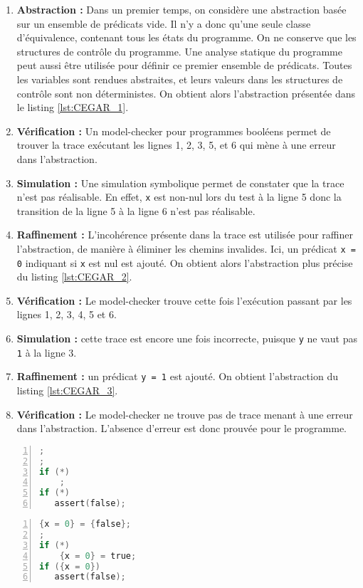 \begin{enumerate}
\def\labelenumi{\arabic{enumi})}
\item
  \textbf{Abstraction :} Dans un premier temps, on considère une abstraction
  basée sur un ensemble de prédicats vide. Il n'y a donc qu'une seule classe
  d'équivalence, contenant tous les états du programme. On ne conserve que les
  structures de contrôle du programme. Une analyse statique du programme peut
  aussi être utilisée pour définir ce premier ensemble de prédicats.
  Toutes les variables sont rendues abstraites, et leurs valeurs dans
  les structures de contrôle sont non déterministes. On obtient alors
  l'abstraction présentée dans le listing \ref{lst:CEGAR_1}.
\item
  \textbf{Vérification :} Un model-checker pour programmes booléens permet de
  trouver la trace exécutant les lignes 1, 2, 3, 5, et 6 qui mène à une erreur
  dans l'abstraction.
\item
  \textbf{Simulation :} Une simulation symbolique permet de constater que la
  trace n'est pas réalisable. En effet, \texttt{x} est non-nul lors
  du test à la ligne 5 donc la transition de la ligne 5 à la ligne 6 n'est pas
  réalisable.
\item
  \textbf{Raffinement :} L'incohérence présente dans la trace est utilisée pour
  raffiner l'abstraction, de manière à éliminer les chemins invalides. Ici, un
  prédicat \texttt{{x = 0}} indiquant si \texttt{x} est nul est ajouté. On
  obtient alors l'abstraction plus précise du listing \ref{lst:CEGAR_2}.
\item
  \textbf{Vérification :} Le model-checker trouve cette fois l'exécution
  passant par les lignes 1, 2, 3, 4, 5 et 6.
\item
  \textbf{Simulation :} cette trace est encore une fois incorrecte, puisque
  \texttt{y} ne vaut pas \texttt{1} à la ligne 3.
\item
  \textbf{Raffinement :} un prédicat \texttt{{y = 1}} est ajouté. On obtient
  l'abstraction du listing \ref{lst:CEGAR_3}.
\item
  \textbf{Vérification :} Le model-checker ne trouve pas de trace menant à une
  erreur dans l'abstraction. L'absence d'erreur est donc prouvée pour le
  programme.
\end{enumerate}

\noindent\begin{minipage}{.45\textwidth}
  \begin{lstlisting}[language=C, label=lst:CEGAR_1, numbers=left, frame=single,
    caption=Abstraction initiale]
;
;
if (*)
    ;
if (*)
   assert(false);
\end{lstlisting}
\end{minipage}\hfill
\begin{minipage}{.45\textwidth}
  \begin{lstlisting}[language=C, label=lst:CEGAR_2, numbers=left, frame=single,
    caption=Premier raffinement]
{x = 0} = {false};
;
if (*)
    {x = 0} = true;
if ({x = 0})
   assert(false);
\end{lstlisting}
\end{minipage}

